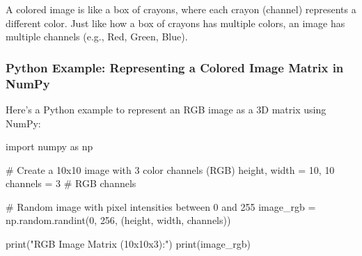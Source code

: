 \documentclass[
  letterpaper,
  DIV=11,
  numbers=noendperiod]{scrreprt}
\newenvironment{Shaded}{\begin{snugshade}}{\end{snugshade}}
\newcommand{\BuiltInTok}[1]{\textcolor[rgb]{0.00,0.23,0.31}{#1}}
\newcommand{\CommentTok}[1]{\textcolor[rgb]{0.37,0.37,0.37}{#1}}
\newcommand{\DecValTok}[1]{\textcolor[rgb]{0.68,0.00,0.00}{#1}}
\newcommand{\ImportTok}[1]{\textcolor[rgb]{0.00,0.46,0.62}{#1}}
\newcommand{\NormalTok}[1]{\textcolor[rgb]{0.00,0.23,0.31}{#1}}
\newcommand{\OperatorTok}[1]{\textcolor[rgb]{0.37,0.37,0.37}{#1}}
\newcommand{\StringTok}[1]{\textcolor[rgb]{0.13,0.47,0.30}{#1}}
\begin{document}
A colored image is like a box of crayons, where each crayon (channel)
represents a different color. Just like how a box of crayons has
multiple colors, an image has multiple channels (e.g., Red, Green,
Blue).

\subsubsection{Python Example: Representing a Colored Image Matrix in
NumPy}\label{python-example-representing-a-colored-image-matrix-in-numpy}

Here's a Python example to represent an RGB image as a 3D matrix using
NumPy:

\begin{Shaded}
\begin{Highlighting}[]
\ImportTok{import}\NormalTok{ numpy }\ImportTok{as}\NormalTok{ np}

\CommentTok{\# Create a 10x10 image with 3 color channels (RGB)}
\NormalTok{height, width }\OperatorTok{=} \DecValTok{10}\NormalTok{, }\DecValTok{10}
\NormalTok{channels }\OperatorTok{=} \DecValTok{3}  \CommentTok{\# RGB channels}

\CommentTok{\# Random image with pixel intensities between 0 and 255}
\NormalTok{image\_rgb }\OperatorTok{=}\NormalTok{ np.random.randint(}\DecValTok{0}\NormalTok{, }\DecValTok{256}\NormalTok{, (height, width, channels))}

\BuiltInTok{print}\NormalTok{(}\StringTok{"RGB Image Matrix (10x10x3):"}\NormalTok{)}
\BuiltInTok{print}\NormalTok{(image\_rgb)}
\end{Highlighting}
\end{Shaded}
\end{document}

